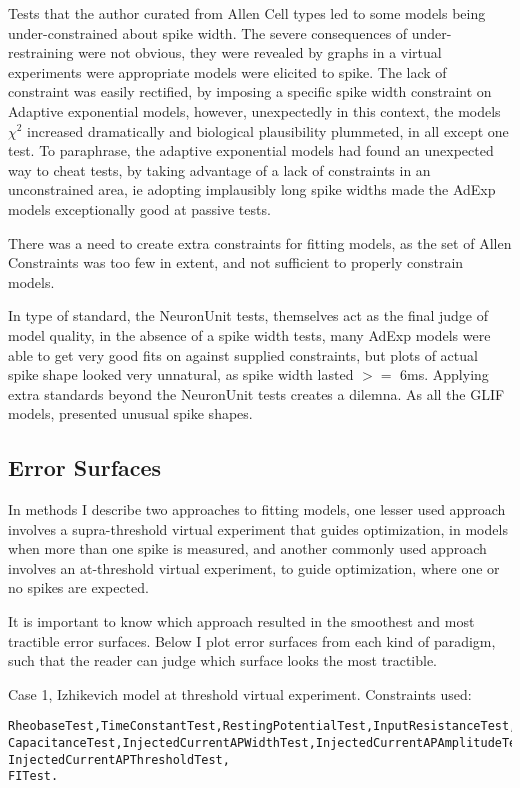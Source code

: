 

Tests that the author curated from Allen Cell types led to some models being under-constrained about spike width. The severe consequences of under-restraining were not obvious, they were revealed by graphs in a virtual experiments were appropriate models were elicited to spike. The lack of constraint was easily rectified, by imposing a specific spike width constraint on Adaptive exponential models, however, unexpectedly in this context, the models $\chi^{2}$ increased dramatically and biological plausibility plummeted, in all except one test. To  paraphrase, the adaptive exponential models had found an unexpected way to cheat tests, by taking advantage of a lack of constraints in an unconstrained area, ie adopting implausibly long spike widths made the AdExp models exceptionally good at passive tests.

There was a need to create extra constraints for fitting models, as the set of Allen Constraints was too few in extent, and not sufficient to properly constrain models.


In type of standard, the NeuronUnit tests, themselves act as the final judge of model quality, in the absence of a spike width tests, many AdExp models were able to get very good fits on against supplied constraints, but plots of actual spike shape looked very unnatural, as spike width lasted $>=$ 6ms. Applying extra standards beyond the NeuronUnit tests creates a dilemna. As all the GLIF models, presented unusual spike shapes.

\subsection{Error Surfaces}
In methods I describe two approaches to fitting models, one lesser used approach involves a supra-threshold virtual experiment that guides optimization, in models when more than one spike is measured, and another commonly used approach involves an at-threshold virtual experiment, to guide optimization, where one or no spikes are expected.

It is important to know which approach resulted in the smoothest and most tractible error surfaces. Below I plot error surfaces from each kind of paradigm, such that the reader can judge which surface looks the most tractible. 

Case 1, Izhikevich model at threshold virtual experiment. Constraints used:
\begin{verbatim}
RheobaseTest,TimeConstantTest,RestingPotentialTest,InputResistanceTest, CapacitanceTest,InjectedCurrentAPWidthTest,InjectedCurrentAPAmplitudeTest, InjectedCurrentAPThresholdTest,
FITest. 
\end{verbatim}

